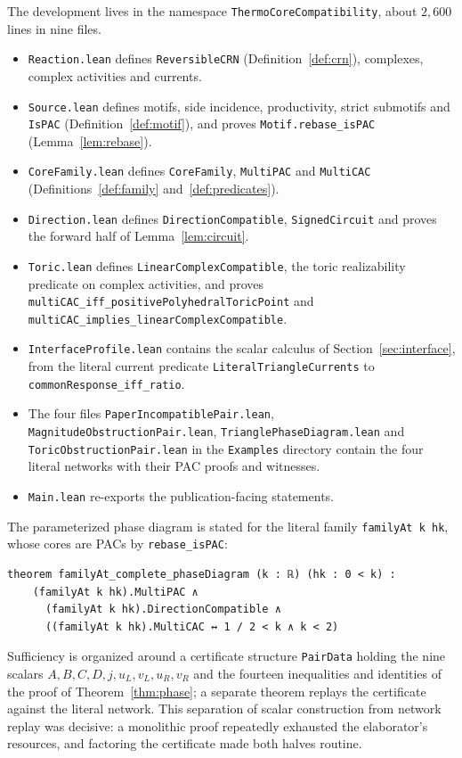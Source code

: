 \documentclass[11pt,a4paper]{article}
\theoremstyle{plain}
\theoremstyle{definition}
\theoremstyle{remark}
\newcommand{\lean}[1]{\texttt{#1}}
\begin{document}
The development lives in the namespace \lean{ThermoCoreCompatibility}, about $2{,}600$ lines in nine files.
\begin{itemize}
\item \lean{Reaction.lean} defines \lean{ReversibleCRN} (Definition~\ref{def:crn}), complexes, complex activities and currents.
\item \lean{Source.lean} defines motifs, side incidence, productivity, strict submotifs and \lean{IsPAC} (Definition~\ref{def:motif}), and proves \lean{Motif.rebase\_isPAC} (Lemma~\ref{lem:rebase}).
\item \lean{CoreFamily.lean} defines \lean{CoreFamily}, \lean{MultiPAC} and \lean{MultiCAC} (Definitions~\ref{def:family} and~\ref{def:predicates}).
\item \lean{Direction.lean} defines \lean{DirectionCompatible}, \lean{SignedCircuit} and proves the forward half of Lemma~\ref{lem:circuit}.
\item \lean{Toric.lean} defines \lean{LinearComplexCompatible}, the toric realizability predicate on complex activities, and proves \lean{multiCAC\_iff\_positivePolyhedralToricPoint} and \lean{multiCAC\_implies\_linearComplexCompatible}.
\item \lean{InterfaceProfile.lean} contains the scalar calculus of Section~\ref{sec:interface}, from the literal current predicate \lean{LiteralTriangleCurrents} to \lean{commonResponse\_iff\_ratio}.
\item The four files \lean{PaperIncompatiblePair.lean}, \lean{MagnitudeObstructionPair.lean}, \lean{TrianglePhaseDiagram.lean} and \lean{ToricObstructionPair.lean} in the \lean{Examples} directory contain the four literal networks with their PAC proofs and witnesses.
\item \lean{Main.lean} re-exports the publication-facing statements.
\end{itemize}

The parameterized phase diagram is stated for the literal family \lean{familyAt k hk}, whose cores are PACs by \lean{rebase\_isPAC}:
\begin{lstlisting}
theorem familyAt_complete_phaseDiagram (k : ℝ) (hk : 0 < k) :
    (familyAt k hk).MultiPAC ∧
      (familyAt k hk).DirectionCompatible ∧
      ((familyAt k hk).MultiCAC ↔ 1 / 2 < k ∧ k < 2)
\end{lstlisting}
Sufficiency is organized around a certificate structure \lean{PairData} holding the nine scalars $A,B,C,D,j,u_L,v_L,u_R,v_R$ and the fourteen inequalities and identities of the proof of Theorem~\ref{thm:phase}; a separate theorem replays the certificate against the literal network. This separation of scalar construction from network replay was decisive: a monolithic proof repeatedly exhausted the elaborator's resources, and factoring the certificate made both halves routine.
\end{document}

